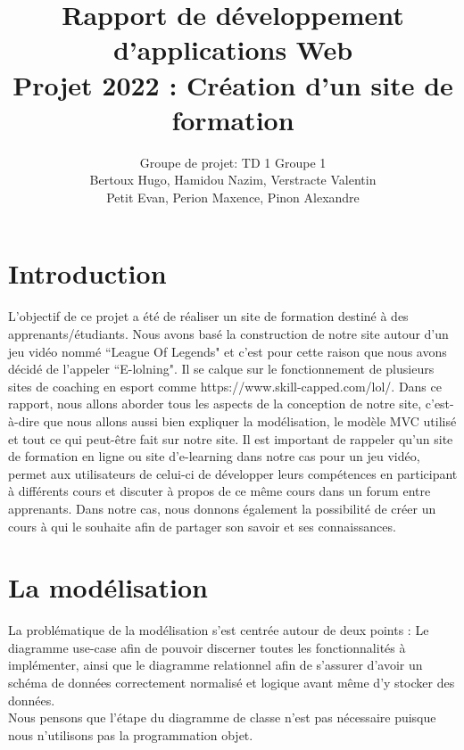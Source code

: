 \documentclass[a4paper,11pt]{article}
\title{
Rapport de développement d'applications Web\\
Projet 2022 : Création d'un site de formation
}
\author{
Groupe de projet: TD 1  Groupe 1\\
Bertoux Hugo, Hamidou Nazim, Verstracte Valentin\\
Petit Evan, Perion Maxence, Pinon Alexandre
}
\date{}
\begin{document}
\maketitle 
\tableofcontents

\newpage
\section{Introduction}
L'objectif de ce projet a été de réaliser un site de formation destiné à des apprenants/étudiants. Nous avons basé la construction de notre site autour d'un jeu vidéo nommé ``League Of Legends" et c'est pour cette raison que nous avons décidé de l'appeler ``E-lolning". Il se calque sur le fonctionnement de plusieurs sites de coaching en esport comme https://www.skill-capped.com/lol/.
Dans ce rapport, nous allons aborder tous les aspects de la conception de notre site, c'est-à-dire que nous allons aussi bien expliquer la modélisation, le modèle MVC utilisé et tout ce qui peut-être fait sur notre site. Il est important de rappeler qu'un site de formation en ligne ou site d'e-learning dans notre cas pour un jeu vidéo, permet aux utilisateurs de celui-ci de développer leurs compétences en participant à différents cours et discuter à propos de ce même cours dans un forum entre apprenants. Dans notre cas, nous donnons également la possibilité de créer un cours à qui le souhaite afin de partager son savoir et ses connaissances. 

\section{La modélisation}
La problématique de la modélisation s'est centrée autour de deux points : Le diagramme use-case afin de pouvoir discerner toutes les fonctionnalités à implémenter, ainsi que le diagramme relationnel afin de s'assurer d'avoir un schéma de données correctement normalisé et logique avant même d'y stocker des données.\\
Nous pensons que l'étape du diagramme de classe n'est pas nécessaire puisque nous n'utilisons pas la programmation objet.
\end{document}
